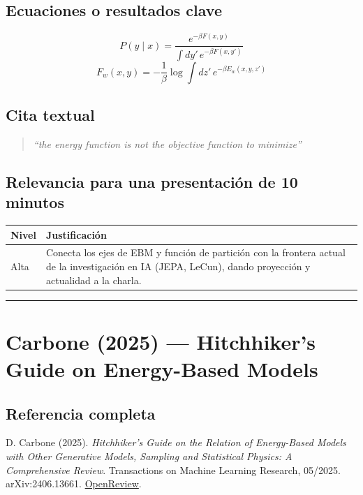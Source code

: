 \documentclass[12pt]{article}
\begin{document}
\subsection*{Ecuaciones o resultados clave}
\begin{equation}
P(y\mid x) = \frac{e^{-\beta F(x,y)}}{\int dy'\, e^{-\beta F(x,y')}}
\end{equation}
\begin{equation}
F_w(x,y) = -\frac{1}{\beta}\log \int dz'\, e^{-\beta E_w(x,y,z')}
\end{equation}

\subsection*{Cita textual}
\begin{quote}
\textit{``the energy function is not the objective function to minimize''}
\end{quote}

\subsection*{Relevancia para una presentación de 10 minutos}
\begin{tabular}{@{}p{2cm}p{11.5cm}@{}}
\toprule
\textbf{Nivel} & \textbf{Justificación} \\
\midrule
Alta & Conecta los ejes de EBM y función de partición con la frontera actual de la investigación en IA (JEPA, LeCun), dando proyección y actualidad a la charla. \\
\bottomrule
\end{tabular}

\bigskip
\hrule
\bigskip

\section{Carbone (2025) --- Hitchhiker's Guide on Energy-Based Models}

\subsection*{Referencia completa}
D. Carbone (2025). \textit{Hitchhiker's Guide on the Relation of Energy-Based Models with
Other Generative Models, Sampling and Statistical Physics: A Comprehensive Review}.
Transactions on Machine Learning Research, 05/2025. arXiv:2406.13661.
\href{https://openreview.net/forum?id=VTgixSbrJI}{OpenReview}. \cite{carbone2025}
\end{document}
